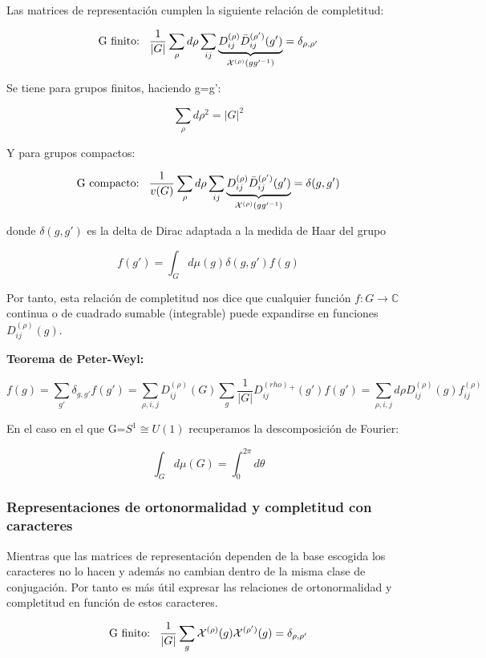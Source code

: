 \documentclass{article}
\begin{document}
    Las matrices de representación cumplen la siguiente relación de completitud:
    
    $$\text{G finito:} \hspace{0.3cm} \frac{1}{|G|}\sum _\rho d\rho \sum _{ij} \underbrace{D_{ij}^{(\rho)}\bar{D}_{ij}^{(\rho ')}(g')}_{\mathcal{X}^{(\rho)}(gg'^{-1})}=\delta _{\rho, \rho '}$$
    
    Se tiene para grupos finitos, haciendo g=g':
    
    $$\sum _\rho d\rho ^2 =|G|^2$$
    
    Y para grupos compactos:
    
     $$\text{G compacto:} \hspace{0.3cm} \frac{1}{v(G)}\sum _\rho d\rho \sum _{ij} \underbrace{D_{ij}^{(\rho)}\bar{D}_{ij}^{(\rho ')}(g')}_{\mathcal{X}^{(\rho)}(gg'^{-1})}=\delta (g,g')$$
    
    donde $\delta (g,g')$ es la delta de Dirac adaptada a la medida de Haar del grupo
    
    $$f(g')=\int _G d\mu (g)\delta (g,g')f(g)$$
    
    Por tanto, esta relación de completitud nos dice que cualquier función $f: G \to \mathds{C}$ continua o de cuadrado sumable (integrable) puede expandirse en funciones $D^{(\rho)}_{ij}(g)$.
    
    \smallskip
    \textbf{Teorema de Peter-Weyl:}
    
    $$f(g)=\sum _{g'}\delta _{g,g'}f(g')=\sum _{\rho,i,j}D_{ij}^{(\rho)}(G)\sum _g \frac{1}{|G|}D_{ij}^{(rho)}^{+}(g')f(g')=\sum _{\rho ,i, j} d\rho D_{ij}^{(\rho)}(g)f_{ij}^{(\rho)}$$
    
    \smallskip
     En el caso en el que G=$S^1\cong U(1)$ recuperamos la descomposición de Fourier:
     
     $$\int _G d \mu (G)=\int ^{2\pi}_0 d\theta$$
    
    \subsubsection{Representaciones de ortonormalidad y completitud con caracteres}
    
    Mientras que las matrices de representación dependen de la base escogida los caracteres no lo hacen y además no cambian dentro de la misma clase de conjugación. Por tanto es más útil expresar las relaciones de ortonormalidad y completitud en función de estos caracteres.
        
         $$\text{G finito:} \hspace{0.3cm} \frac{1}{|G|}\sum _g\mathcal{X}^{(\rho)}(g)\mathcal{X}^{(\rho ')}(g)=\delta _{\rho , \rho '}$$
         
\end{document}
